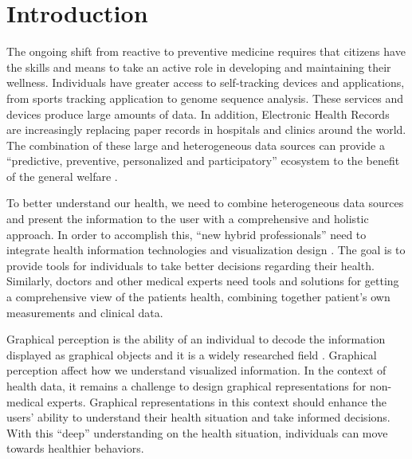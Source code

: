 \documentclass[twocolumn]{bmcart}%
\begin{document}


\section*{Introduction}
The ongoing shift from reactive to preventive medicine requires that citizens have the skills and means to take an active role in developing and maintaining their wellness. Individuals have greater access to self-tracking devices and applications, from sports tracking application to genome sequence analysis. These services and devices produce large amounts of data. In addition, Electronic Health Records are increasingly replacing paper records in hospitals and clinics around the world. The combination of these large and heterogeneous data sources can provide a ``predictive, preventive, personalized and participatory'' ecosystem to the benefit of the general welfare \cite{Hood2012613}.

To better understand our health, we need to combine heterogeneous data sources and present the information to the user with a comprehensive and holistic approach. In order to accomplish this, ``new hybrid professionals'' need to integrate health information technologies and visualization design \cite{lesselroth2011data}. The goal is to provide tools for individuals to take better decisions regarding their health. Similarly, doctors and other medical experts need tools and solutions for getting a comprehensive view of the patients health, combining together patient's own measurements and clinical data.

Graphical perception is the ability of an individual to decode the information displayed as graphical objects \cite{baird1978fundamentals} and it is a widely researched field \cite{cleveland1984graphical}. Graphical perception affect how we understand visualized information. In the context of health data, it remains a challenge to design graphical representations for non-medical experts. Graphical representations in this context should enhance the users' ability to understand their health situation and take informed decisions. With this ``deep'' understanding on the health situation, individuals can move towards healthier behaviors.
\end{document}
